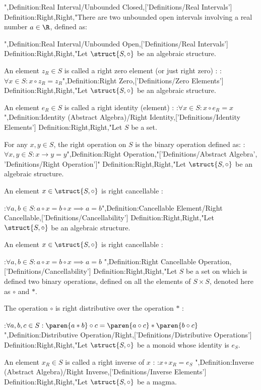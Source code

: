 ",Definition:Real Interval/Unbounded Closed,['Definitions/Real Intervals']
Definition:Right,Right,"There are two unbounded open intervals involving a real number $a \in \R$, defined as:




",Definition:Real Interval/Unbounded Open,['Definitions/Real Intervals']
Definition:Right,Right,"Let $\struct {S, \circ}$ be an algebraic structure.

An element $z_R \in S$ is called a right zero element (or just right zero) :
:$\forall x \in S: x \circ z_R = z_R$",Definition:Right Zero,['Definitions/Zero Elements']
Definition:Right,Right,"Let $\struct {S, \circ}$ be an algebraic structure.

An element $e_R \in S$ is called a right identity (element) :
:$\forall x \in S: x \circ e_R = x$
",Definition:Identity (Abstract Algebra)/Right Identity,['Definitions/Identity Elements']
Definition:Right,Right,"Let $S$ be a set.

For any $x, y \in S$, the right operation on $S$ is the binary operation defined as:
:$\forall x, y \in S: x \to y = y$",Definition:Right Operation,"['Definitions/Abstract Algebra', 'Definitions/Right Operation']"
Definition:Right,Right,"Let $\struct {S, \circ}$ be an algebraic structure.


An element $x \in \struct {S, \circ}$ is right cancellable :

:$\forall a, b \in S: a \circ x = b \circ x \implies a = b$",Definition:Cancellable Element/Right Cancellable,['Definitions/Cancellability']
Definition:Right,Right,"Let $\struct {S, \circ}$ be an algebraic structure.


An element $x \in \struct {S, \circ}$ is right cancellable :

:$\forall a, b \in S: a \circ x = b \circ x \implies a = b$
",Definition:Right Cancellable Operation,['Definitions/Cancellability']
Definition:Right,Right,"Let $S$ be a set on which is defined two binary operations, defined on all the elements of $S \times S$, denoted here as $\circ$ and $*$.

The operation $\circ$ is right distributive over the operation $*$ :

:$\forall a, b, c \in S: \paren {a * b} \circ c = \paren {a \circ c} * \paren {b \circ c}$",Definition:Distributive Operation/Right,['Definitions/Distributive Operations']
Definition:Right,Right,"Let $\struct {S, \circ}$ be a monoid whose identity is $e_S$.

An element $x_R \in S$ is called a right inverse of $x$ :
:$x \circ x_R = e_S$
",Definition:Inverse (Abstract Algebra)/Right Inverse,['Definitions/Inverse Elements']
Definition:Right,Right,"Let $\struct {S, \circ}$ be a magma.

